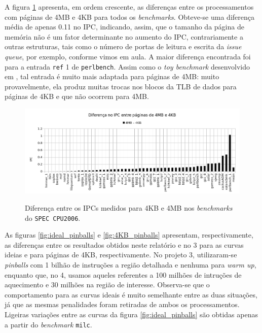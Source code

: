 \documentclass[12pt]{article}
\begin{document}
A figura \ref{fig:diferenca-result} apresenta, em ordem crescente, as diferenças
entre os processamentos com páginas de 4MB e 4KB para todos os
\textit{benchmarks}. Obteve-se uma diferença média de apenas 0.11 no IPC,
indicando, assim, que o tamanho da página de memória não é um fator determinante
no aumento do IPC, contrariamente a outras estruturas, tais como o número de
portas de leitura e escrita da \textit{issue queue}, por exemplo, conforme
vimos em aula. A maior diferença encontrada foi para a entrada \texttt{ref} 1 de
\texttt{perlbench}. Assim como o \textit{toy benchmark} desenvolvido em
\cite{relatorio2}, tal entrada é muito mais adaptada para páginas de 4MB: muito
provavelmente, ela produz muitas trocas nos blocos da TLB de dados para páginas
de 4KB e que não ocorrem para 4MB.

\begin{figure}[h!]
  \centering
  \includegraphics[width=\textwidth]{img/diferenca}%
  \label{fig:diferenca-result}%
  \caption{Diferença entre os IPCs medidos para 4KB e 4MB nos
  \textit{benchmarks} do \texttt{SPEC CPU2006}.}
\end{figure}

As figuras \ref{fig:ideal_pinballs} e \ref{fig:4KB_pinballs} apresentam,
respectivamente, as diferenças entre os resultados obtidos neste relatório e no
3 \cite{relatorio3} para as curvas ideias e para páginas de 4KB,
respectivamente. No projeto 3, utilizaram-se \textit{pinballs} com 1 bilhão de
instruções a região detalhada e nenhuma para \textit{warm up}, enquanto que,
no 4, usamos aqueles referentes a 100 milhões de intruções de aquecimento e 30
milhões na região de interesse. Observa-se que o comportamento para as curvas
ideais é muito semelhante entre as duas situações, já que as mesmas penalidades
foram retiradas de ambos os processamentos. Ligeiras variações entre as curvas da
figura \ref{fig:ideal_pinballs} são obtidas apenas a partir do
\textit{benchmark} \texttt{milc}.
\end{document}
